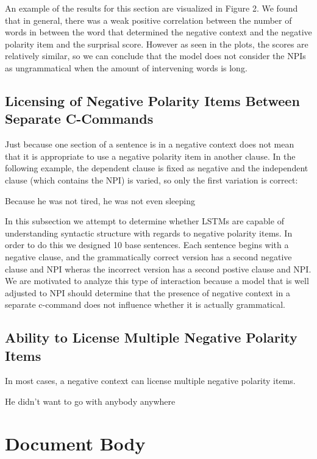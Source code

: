 \documentclass[11pt]{article}
\begin{document}
An example of the results for this section are visualized in Figure 2. We found that in general, there was a weak positive correlation between the number of words in between the word that determined the negative context and the negative polarity item and the surprisal score. However as seen in the plots, the scores are relatively similar, so we can conclude that the model does not consider the NPIs as ungrammatical when the amount of intervening words is long.
\subsection{Licensing of Negative Polarity Items Between Separate C-Commands}
Just because one section of a sentence is in a negative context does not mean that it is appropriate to use a negative polarity item in another clause. In the following example, the dependent clause is fixed as negative and the independent clause (which contains the NPI) is varied, so only the first variation is correct:
\begin{exe}
\ex
\begin{xlist}
\ex Because he was not tired, he was not even sleeping
\end{xlist}
\end{exe}
In this subsection we attempt to determine whether LSTMs are capable of understanding syntactic structure with regards to negative polarity items. In order to do this we designed 10 base sentences. Each sentence begins with a negative clause, and the grammatically correct version has a second negative clause and NPI wheras the incorrect version has a second postive clause and NPI. We are motivated to analyze this type of interaction because a model that is well adjusted to NPI should determine that the presence of negative context in a separate c-command does not influence whether it is actually grammatical.
\subsection{Ability to License Multiple Negative Polarity Items}
In most cases, a negative context can license multiple negative polarity items.
\begin{exe}
\ex
\begin{xlist}
\ex He didn't want to go with anybody anywhere
\end{xlist}
\end{exe}


\section{Document Body}
\end{document}
